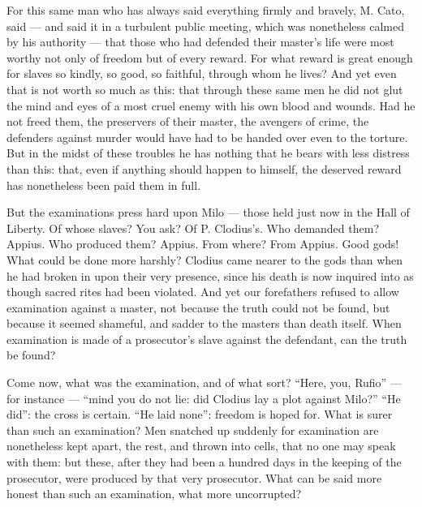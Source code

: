  For this same man who has always said everything firmly and bravely, M. Cato, said --- and said it in a turbulent public meeting, which was nonetheless calmed by his authority --- that those who had defended their master's life were most worthy not only of freedom but of every reward. For what reward is great enough for slaves so kindly, so good, so faithful, through whom he lives? And yet even that is not worth so much as this: that through these same men he did not glut the mind and eyes of a most cruel enemy with his own blood and wounds. Had he not freed them, the preservers of their master, the avengers of crime, the defenders against murder would have had to be handed over even to the torture. But in the midst of these troubles he has nothing that he bears with less distress than this: that, even if anything should happen to himself, the deserved reward has nonetheless been paid them in full.

 But the examinations press hard upon Milo --- those held just now in the Hall of Liberty. Of whose slaves? You ask? Of P. Clodius's. Who demanded them? Appius. Who produced them? Appius. From where? From Appius. Good gods! What could be done more harshly? Clodius came nearer to the gods than when he had broken in upon their very presence, since his death is now inquired into as though sacred rites had been violated. And yet our forefathers refused to allow examination against a master, not because the truth could not be found, but because it seemed shameful, and sadder to the masters than death itself. When examination is made of a prosecutor's slave against the defendant, can the truth be found?

 Come now, what was the examination, and of what sort? ``Here, you, Rufio'' --- for instance --- ``mind you do not lie: did Clodius lay a plot against Milo?'' ``He did'': the cross is certain. ``He laid none'': freedom is hoped for. What is surer than such an examination? Men snatched up suddenly for examination are nonetheless kept apart, the rest, and thrown into cells, that no one may speak with them: but these, after they had been a hundred days in the keeping of the prosecutor, were produced by that very prosecutor. What can be said more honest than such an examination, what more uncorrupted?

